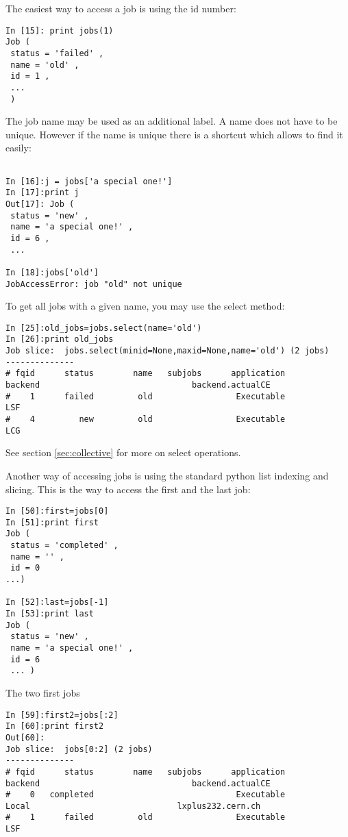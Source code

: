 \documentclass{howto}
\begin{document}
The easiest way to access a job is using the id number:

\begin{verbatim}
In [15]: print jobs(1)
Job (
 status = 'failed' ,
 name = 'old' ,
 id = 1 ,
 ...
 )

\end{verbatim}

The job name may be used as an additional label. A name does not have
to be unique. However if the name is unique there is a shortcut which
allows to find it easily:

\begin{verbatim}

In [16]:j = jobs['a special one!']
In [17]:print j
Out[17]: Job (
 status = 'new' ,
 name = 'a special one!' ,
 id = 6 ,
 ...

In [18]:jobs['old']
JobAccessError: job "old" not unique
\end{verbatim}

To get all jobs with a given name, you may use the select method:

\begin{verbatim}
In [25]:old_jobs=jobs.select(name='old')
In [26]:print old_jobs
Job slice:  jobs.select(minid=None,maxid=None,name='old') (2 jobs)
--------------
# fqid      status        name   subjobs      application          backend                               backend.actualCE
#    1      failed         old                 Executable              LSF
#    4         new         old                 Executable              LCG
\end{verbatim}

See section \ref{sec:collective} for more on select operations.

Another way of accessing jobs is using the standard python list indexing and slicing. This is the way to access the first and the last job:

\begin{verbatim}
In [50]:first=jobs[0]
In [51]:print first
Job (
 status = 'completed' ,
 name = '' ,
 id = 0
...)

In [52]:last=jobs[-1]
In [53]:print last
Job (
 status = 'new' ,
 name = 'a special one!' ,
 id = 6
 ... )
\end{verbatim}

The two first jobs

\begin{verbatim}
In [59]:first2=jobs[:2]
In [60]:print first2
Out[60]:
Job slice:  jobs[0:2] (2 jobs)
--------------
# fqid      status        name   subjobs      application          backend                               backend.actualCE
#    0   completed                             Executable            Local                              lxplus232.cern.ch
#    1      failed         old                 Executable              LSF
\end{verbatim}
\end{document}
